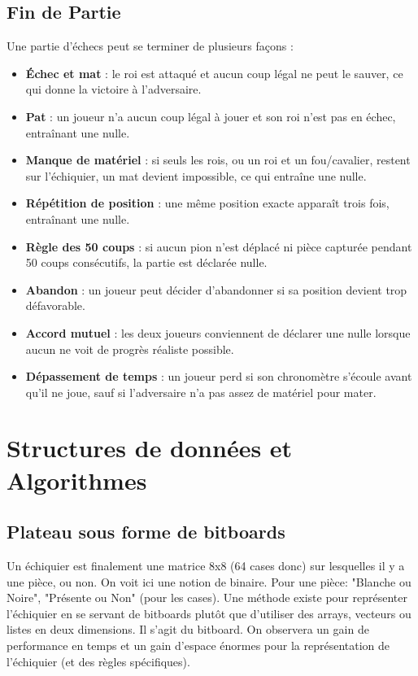 \documentclass{article}
\begin{document}
\subsection{Fin de Partie}
Une partie d'échecs peut se terminer de plusieurs façons :
\begin{itemize}
    \item \textbf{Échec et mat} : le roi est attaqué et aucun coup légal ne peut le sauver, ce qui donne la victoire à l'adversaire.
    \item \textbf{Pat} : un joueur n'a aucun coup légal à jouer et son roi n'est pas en échec, entraînant une nulle.
    \item \textbf{Manque de matériel} : si seuls les rois, ou un roi et un fou/cavalier, restent sur l'échiquier, un mat devient impossible, ce qui entraîne une nulle.
    \item \textbf{Répétition de position} : une même position exacte apparaît trois fois, entraînant une nulle.
    \item \textbf{Règle des 50 coups} : si aucun pion n'est déplacé ni pièce capturée pendant 50 coups consécutifs, la partie est déclarée nulle.
    \item \textbf{Abandon} : un joueur peut décider d'abandonner si sa position devient trop défavorable.
    \item \textbf{Accord mutuel} : les deux joueurs conviennent de déclarer une nulle lorsque aucun ne voit de progrès réaliste possible.
    \item \textbf{Dépassement de temps} : un joueur perd si son chronomètre s'écoule avant qu'il ne joue, sauf si l'adversaire n'a pas assez de matériel pour mater.
\end{itemize}



\section{Structures de données et Algorithmes}
\label{DataStruct}

\subsection{Plateau sous forme de bitboards}
Un échiquier est finalement une matrice 8x8 (64 cases donc) sur lesquelles il y a une pièce, ou non. On voit ici une
notion de binaire. Pour une pièce: "Blanche ou Noire", "Présente ou Non" (pour les cases). Une méthode existe pour
représenter l'échiquier en se servant de bitboards plutôt que d'utiliser des arrays, vecteurs ou listes en deux dimensions.
Il s'agit du bitboard. On observera un gain de performance en temps et un gain d'espace énormes pour la représentation
de l'échiquier (et des règles spécifiques).
\end{document}
